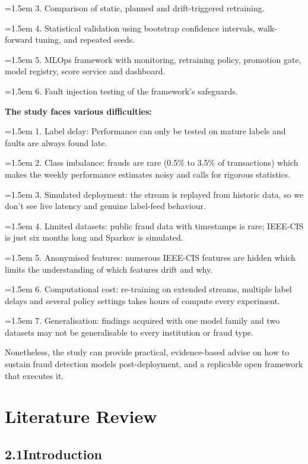 \documentclass[11pt,letterpaper]{report}
\newcommand{\listitem}[1]{\par\hangindent=1.5em\hangafter=1 #1\par}
\begin{document}
\listitem{3. Comparison of static, planned and drift-triggered retraining.}

\listitem{4. Statistical validation using bootstrap confidence intervals, walk-forward tuning, and repeated seeds.}

\listitem{5. MLOps framework with monitoring, retraining policy, promotion gate, model registry, score service and dashboard.}

\listitem{6. Fault injection testing of the framework's safeguards.}

\noindent\textbf{The study faces various difficulties:}

\listitem{1. Label delay: Performance can only be tested on mature labels and faults are always found late.}

\listitem{2. Class imbalance: frauds are rare (0.5\% to 3.5\% of transactions) which makes the weekly performance estimates noisy and calls for rigorous statistics.}

\listitem{3. Simulated deployment: the stream is replayed from historic data, so we don't see live latency and genuine label-feed behaviour.}

\listitem{4. Limited datasets: public fraud data with timestamps is rare; IEEE-CIS is just six months long and Sparkov is simulated.}

\listitem{5. Anonymised features: numerous IEEE-CIS features are hidden which limits the understanding of which features drift and why.}

\listitem{6. Computational cost: re-training on extended streams, multiple label delays and several policy settings takes hours of compute every experiment.}

\listitem{7. Generalisation: findings acquired with one model family and two datasets may not be generalisable to every institution or fraud type.}

Nonetheless, the study can provide practical, evidence-based advise on how to sustain fraud detection models post-deployment, and a replicable open framework that executes it.

\setcounter{chapter}{1}
\chapter{Literature Review}

\section*{2.1\quad Introduction}
\end{document}
